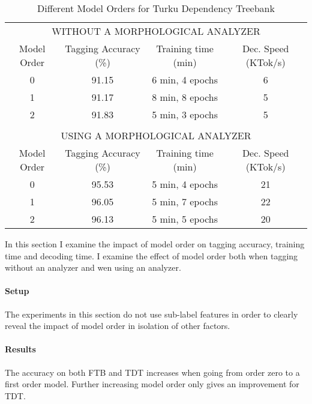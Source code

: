 \begin{table}[htb!]
\begin{center}
\begin{tabular}{c|c|c|c}
\multicolumn{4}{c}{{\small\uppercase{Without a Morphological Analyzer}}}\\
\noalign{\smallskip}
\hline
Model Order & Tagging Accuracy (\%) & Training time (min) & Dec. Speed (KTok/s)\\
\hline
0        & 91.15            & 6 min, 4 epochs            & 6            \\
1        & 91.17            & 8 min, 8 epochs            & 5            \\
2        & 91.83            & 5 min, 3 epochs            & 5            \\
\multicolumn{4}{c}{ }\\%
\multicolumn{4}{c}{{\small\uppercase{Using a Morphological Analyzer}}}\\
\noalign{\smallskip}
\hline
Model Order & Tagging Accuracy (\%) & Training time (min) & Dec. Speed (KTok/s)\\
\hline
0        & 95.53            & 5 min, 4 epochs            & 21            \\
1        & 96.05            & 5 min, 7 epochs            & 22            \\
2        & 96.13            & 5 min, 5 epochs            & 20            \\

\end{tabular}
\caption{Different Model Orders for Turku Dependency Treebank}
\end{center}
\end{table}

In this section I examine the impact of model order on tagging
accuracy, training time and decoding time. I examine the effect of
model order both when tagging without an analyzer and wen using an
analyzer.

\paragraph{Setup} The experiments in this section do not use sub-label
features in order to clearly reveal the impact of model order in
isolation of other factors.

\paragraph{Results} The accuracy on both FTB and TDT increases when
going from order zero to a first order model. Further increasing
model order only gives an improvement for TDT.


